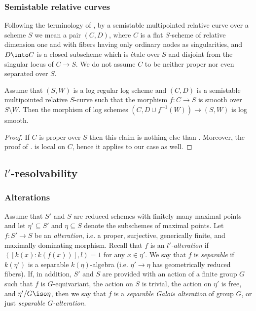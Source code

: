 \documentclass[10pt]{../fichiers-configuration-latex/smfart}
\begin{document}
\subsubsection{Semistable relative curves}\label{10-relcurvesec}
Following the terminology of \cite{Temkin@stable}, by a semistable multipointed
relative curve over a scheme $S$ we mean a pair $(C,D)$, where $C$ is a flat
$S$-scheme of relative dimension one and with fibers having only ordinary nodes
as singularities, and $D\into C$ is a closed subscheme which is étale over $S$
and disjoint from the singular locus of $C\to S$. We do not assume $C$ to be neither
proper nor even separated over $S$.

\begin{proposition2}\label{10-logsmprop}
Assume that $(S,W)$ is a log regular log scheme and $(C,D)$ is a semistable multipointed
relative $S$-curve such that the morphism $f{\colon}C\to S$ is smooth over $S\setminus W$.
Then the morphism of log schemes $(C,D\cup f^{-1}(W))\to(S,W)$ is log smooth.
\end{proposition2}
\begin{proof}
If $C$ is proper over $S$ then this claim is nothing else than . Moreover, the proof of . is local on $C$,
hence it applies to our case as well.
\end{proof}

\subsection{$l'$-resolvability}\label{10-lresolvesec}

\subsubsection{Alterations}
Assume that $S'$ and $S$ are reduced schemes with finitely many maximal points and let
$\eta'\subseteq S'$ and $\eta\subseteq S$ denote the subschemes of maximal points.
Let $f{\colon}S'\to S$ be an {\em alteration}, i.e. a proper, surjective, generically finite,
and maximally dominating morphism. Recall that $f$ is an {\em $l'$-alteration} if
$([k(x):k(f(x))],l)=1$ for any $x\in\eta'$. We say that $f$ is {\em separable} if
$k(\eta')$ is a separable $k(\eta)$-algebra (i.e. $\eta'\to\eta$ has geometrically
reduced fibers). If, in addition, $S'$ and $S$ are provided with an action of
a finite group $G$ such that $f$ is $G$-equivariant, the action on $S$ is trivial,
the action on $\eta'$ is free, and $\eta'/G\iso\eta$, then we say that $f$ is a
{\em separable Galois alteration} of group $G$, or just {\em separable $G$-alteration}.
\end{document}
